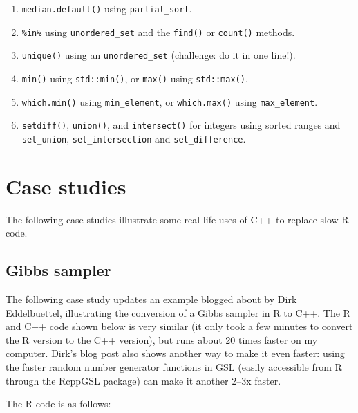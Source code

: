 \begin{enumerate}
\def\labelenumi{\arabic{enumi}.}
\item
  \texttt{median.default()} using \texttt{partial\_sort}.
\item
  \texttt{\%in\%} using \texttt{unordered\_set} and the \texttt{find()}
  or \texttt{count()} methods.
\item
  \texttt{unique()} using an \texttt{unordered\_set} (challenge: do it
  in one line!).
\item
  \texttt{min()} using \texttt{std::min()}, or \texttt{max()} using
  \texttt{std::max()}.
\item
  \texttt{which.min()} using \texttt{min\_element}, or
  \texttt{which.max()} using \texttt{max\_element}.
\item
  \texttt{setdiff()}, \texttt{union()}, and \texttt{intersect()} for
  integers using sorted ranges and \texttt{set\_union},
  \texttt{set\_intersection} and \texttt{set\_difference}.
\end{enumerate}

\hypertarget{rcpp-case-studies}{%
\section{Case studies}\label{rcpp-case-studies}}

The following case studies illustrate some real life uses of C++ to
replace slow R code.

\hypertarget{gibbs-sampler}{%
\subsection{Gibbs sampler}\label{gibbs-sampler}}

The following case study updates an example
\href{http://dirk.eddelbuettel.com/blog/2011/07/14/}{blogged about} by
Dirk Eddelbuettel, illustrating the conversion of a Gibbs sampler in R
to C++. The R and C++ code shown below is very similar (it only took a
few minutes to convert the R version to the C++ version), but runs about
20 times faster on my computer. Dirk's blog post also shows another way
to make it even faster: using the faster random number generator
functions in GSL (easily accessible from R through the RcppGSL package)
can make it another 2--3x faster. 

The R code is as follows:

